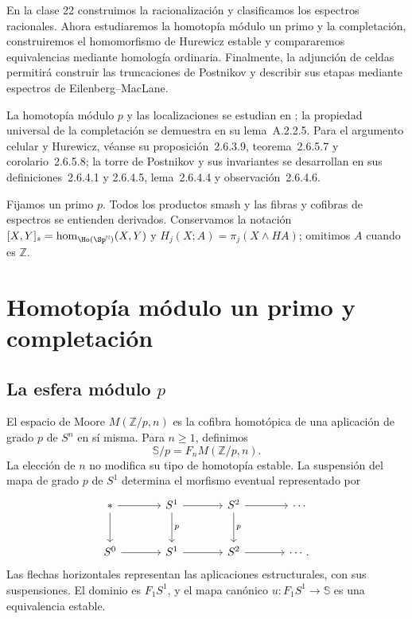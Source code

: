 
En la clase 22 construimos la racionalización y clasificamos los espectros racionales. Ahora estudiaremos la homotopía módulo un primo y la completación, construiremos el homomorfismo de Hurewicz estable y compararemos equivalencias mediante homología ordinaria. Finalmente, la adjunción de celdas permitirá construir las truncaciones de Postnikov y describir sus etapas mediante espectros de Eilenberg--MacLane.

La homotopía módulo $p$ y las localizaciones se estudian en \cite[ejemplos~2.5.3.3 y 3.3.3.2--3]{malkiewich}; la propiedad universal de la completación se demuestra en su lema~A.2.2.5. Para el argumento celular y Hurewicz, véanse su proposición~2.6.3.9, teorema~2.6.5.7 y corolario~2.6.5.8; la torre de Postnikov y sus invariantes se desarrollan en sus definiciones~2.6.4.1 y 2.6.4.5, lema~2.6.4.4 y observación~2.6.4.6.

Fijamos un primo $p$. Todos los productos smash y las fibras y cofibras de espectros se entienden derivados. Conservamos la notación $[X,Y]_s=\hom_{\Ho(\Sp^{\mathbb N})}(X,Y)$ y $H_j(X;A)=\pi_j(X\wedge HA)$; omitimos $A$ cuando es $\mathbb Z$.

\section{Homotopía módulo un primo y completación}

\subsection{La esfera módulo \texorpdfstring{$p$}{p}}
El espacio de Moore $M(\mathbb Z/p,n)$ es la cofibra homotópica de una aplicación de grado $p$ de $S^n$ en sí misma. Para $n\geq1$, definimos
\[
\mathbb S/p=F_nM(\mathbb Z/p,n).
\]
La elección de $n$ no modifica su tipo de homotopía estable. La suspensión del mapa de grado $p$ de $S^1$ determina el morfismo eventual representado por
\[
\begin{tikzcd}[column sep=large,row sep=large]
*\arrow[r]\arrow[d]&S^1\arrow[r]\arrow[d,"p"]&S^2\arrow[r]\arrow[d,"p"]&\cdots\\
S^0\arrow[r]&S^1\arrow[r]&S^2\arrow[r]&\cdots.
\end{tikzcd}
\]
Las flechas horizontales representan las aplicaciones estructurales, con sus suspensiones. El dominio es $F_1S^1$, y el mapa canónico $u\colon F_1S^1\to\mathbb S$ es una equivalencia estable.


